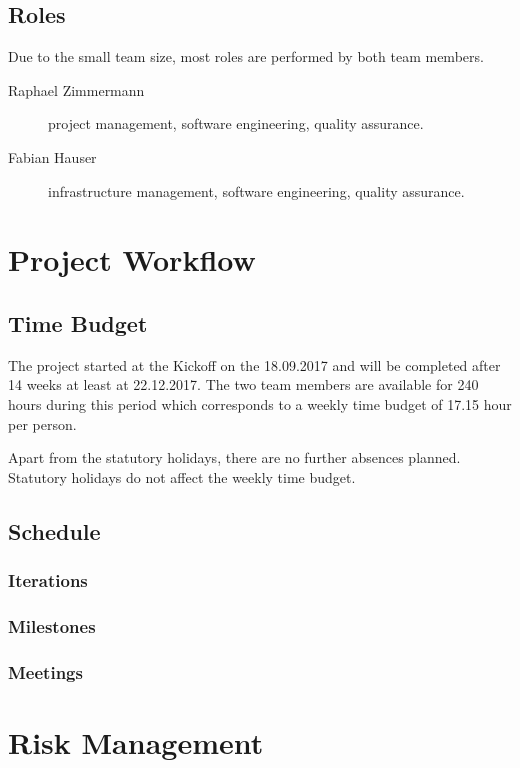 \documentclass[a4paper]{article}
\begin{document}
\subsection{Roles}

Due to the small team size, most roles are performed by both team members.

\begin{description}
	\item[Raphael Zimmermann] project management, software engineering, quality assurance.
	\item[Fabian Hauser] infrastructure management, software engineering, quality assurance.
\end{description}

\section{Project Workflow}
\subsection{Time Budget}

The project started at the Kickoff on the 18.09.2017 and will be completed after 14 weeks at least at 22.12.2017.
The two team members are available for 240 hours during this period which corresponds to a weekly time budget of 17.15 hour per person.

Apart from the statutory holidays, there are no further absences planned. Statutory holidays do not affect the weekly time budget.

\subsection{Schedule}
\subsubsection{Iterations}
\subsubsection{Milestones}
\subsubsection{Meetings}


\section{Risk Management}
\end{document}

